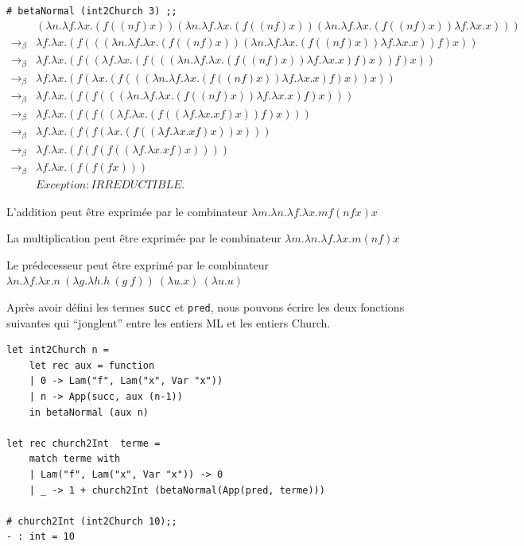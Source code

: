 \verb+# betaNormal (int2Church 3) ;;+
$$
\begin{array}{ll}
 & (\lambda n . \lambda f . \lambda x . (f((nf)x))(\lambda n . \lambda f . \lambda x . (f((nf)x))(\lambda n . \lambda f . \lambda x . (f((nf)x))\lambda f . \lambda x . x)))   \\
\rightarrow _\beta & \lambda f . \lambda x . (f(((\lambda n . \lambda f . \lambda x . (f((nf)x))(\lambda n . \lambda f . \lambda x . (f((nf)x))\lambda f . \lambda x . x))f)x))   \\
\rightarrow _\beta & \lambda f . \lambda x . (f((\lambda f . \lambda x . (f(((\lambda n . \lambda f . \lambda x . (f((nf)x))\lambda f . \lambda x . x)f)x))f)x))   \\
\rightarrow _\beta & \lambda f . \lambda x . (f(\lambda x . (f(((\lambda n . \lambda f . \lambda x . (f((nf)x))\lambda f . \lambda x . x)f)x))x))   \\
\rightarrow _\beta & \lambda f . \lambda x . (f(f(((\lambda n . \lambda f . \lambda x . (f((nf)x))\lambda f . \lambda x . x)f)x)))   \\
\rightarrow _\beta & \lambda f . \lambda x . (f(f((\lambda f . \lambda x . (f((\lambda f . \lambda x . xf)x))f)x)))   \\
\rightarrow _\beta & \lambda f . \lambda x . (f(f(\lambda x . (f((\lambda f . \lambda x . xf)x))x)))   \\
\rightarrow _\beta & \lambda f . \lambda x . (f(f(f((\lambda f . \lambda x . xf)x))))   \\
\rightarrow _\beta & \lambda f . \lambda x . (f(f(fx)))   \\
& Exception: IRREDUCTIBLE. 
\end{array}
$$

L'addition peut être  exprimée par le combinateur $\lambda m .\lambda n .\lambda f. \lambda x. m f (n f x) x$ 


La multiplication peut être exprimée par le combinateur $\lambda m .\lambda n .\lambda f. \lambda x. m (n f) x $ 


Le prédecesseur peut être exprimé par le combinateur $\lambda n.\lambda f.\lambda x.n\ (\lambda g.\lambda h.h\ (g\ f))\ (\lambda u.x)\ (\lambda u.u) $ 


Après avoir défini les termes \verb+succ+ et \verb+pred+, nous pouvons écrire les deux fonctions suivantes qui ``jonglent''
entre les entiers ML et les entiers Church.
\begin{Verbatim}
let int2Church n = 
	let rec aux = function
	| 0 -> Lam("f", Lam("x", Var "x"))
	| n -> App(succ, aux (n-1))
	in betaNormal (aux n)

let rec church2Int  terme = 
	match terme with
	| Lam("f", Lam("x", Var "x")) -> 0
	| _ -> 1 + church2Int (betaNormal(App(pred, terme)))

# church2Int (int2Church 10);;
- : int = 10
\end{Verbatim}


